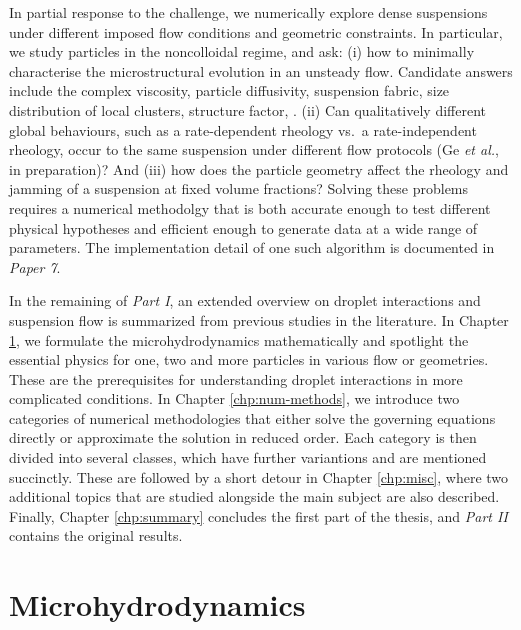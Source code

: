 \medskip
In partial response to the challenge, we numerically explore dense suspensions under different imposed flow conditions and geometric constraints.
In particular, we study particles in the noncolloidal regime, and ask:
(i) how to minimally characterise the microstructural evolution in an unsteady flow. Candidate answers include the complex viscosity, particle diffusivity, suspension fabric, size distribution of local clusters, structure factor, \etc \citep{Brady_Bossis1988, Sal03, Ness_Xing_Eiser_2017}.
(ii) Can qualitatively different global behaviours, such as a rate-dependent rheology vs.\ a rate-independent rheology, occur to the same suspension under different flow protocols (Ge \textit{et al.}, in preparation)? And
(iii) how does the particle geometry affect the rheology and jamming of a suspension at fixed volume fractions?
Solving these problems requires a numerical methodolgy that is both accurate enough to test different physical hypotheses and efficient enough to generate data at a wide range of parameters. The implementation detail of one such algorithm is documented in \emph{Paper 7}.


\thesisstructure
In the remaining of \emph{Part I}, an extended overview on droplet interactions and suspension flow is summarized from previous studies in the literature.
In Chapter \ref{chp:micro-hydro}, we formulate the microhydrodynamics mathematically and spotlight the essential physics for one, two and more particles in various flow or geometries. These are the prerequisites for understanding droplet interactions in more complicated conditions.
In Chapter \ref{chp:num-methods}, we introduce two categories of numerical methodologies that either solve the governing equations directly or approximate the solution in reduced order. Each category is then divided into several classes, which have further variantions and are mentioned succinctly.
These are followed by a short detour in Chapter \ref{chp:misc}, where two additional topics that are studied alongside the main subject are also described.
Finally, Chapter \ref{chp:summary} concludes the first part of the thesis, and \emph{Part II} contains the original results.


\chapter{Microhydrodynamics}  \label{chp:micro-hydro}


